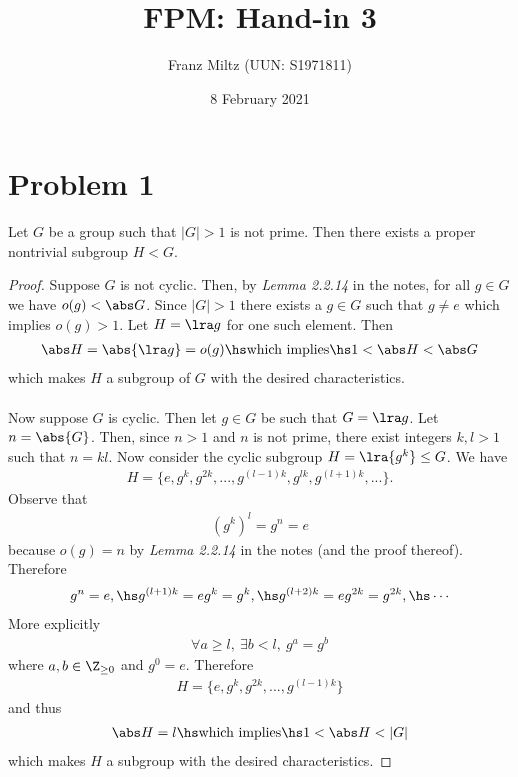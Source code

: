 \documentclass{article}
\begin{document}
\title{FPM: Hand-in 3}
\author{Franz Miltz (UUN: S1971811)}
\date{8 February 2021}
\maketitle

\section*{Problem 1}

\begin{claim*}
	Let $G$ be a group such that $|G|>1$ is not prime. Then
	there exists a proper nontrivial subgroup $H<G$.
\end{claim*}

\begin{proof}
	Suppose $G$ is not cyclic. Then, by \emph{Lemma 2.2.14} in the notes,
	for all $g\in G$ we have $o(g)<\abs G$. Since $|G|>1$ there exists
	a $g\in G$ such that $g\not=e$ which implies $o(g)>1$.
	Let $H=\lra g$ for one such element. Then
	\begin{align*}
		\abs H = \abs{\lra g} = o(g) \hs\text{which implies}\hs 1 < \abs H < \abs G
	\end{align*}
	which makes $H$ a subgroup of $G$ with
	the desired characteristics.\\\\
	Now suppose $G$ is cyclic. Then let $g\in G$ be such that
	$G=\lra g$. Let $n=\abs{G}$. Then, since $n>1$ and $n$ is not prime,
	there exist integers $k,l>1$ such that $n=kl$.
	Now consider the cyclic subgroup $H=\lra{g^k}\leq G$. We have
	\begin{align*}
		H =\{e, g^k, g^{2k}, ..., g^{(l-1)k}, g^{lk}, g^{(l+1)k}, ...\}.
	\end{align*}
	Observe that
	\begin{align*}
		\left(g^k\right)^l = g^n = e
	\end{align*}
	because $o(g)=n$ by \emph{Lemma 2.2.14} in the notes (and the proof
	thereof). Therefore
	\begin{align*}
		g^n = e,\hs g^{(l+1)k} = eg^k = g^k, \hs g^{(l+2)k}=eg^{2k}=g^{2k},\hs \cdots
	\end{align*}
	More explicitly
	\begin{align*}
		\forall a \geq l,\: \exists b<l,\: g^a = g^b
	\end{align*}
	where $a,b\in\Z_{\geq 0}$ and $g^0 = e$. Therefore
	\begin{align*}
		H = \{e, g^k, g^{2k}, ..., g^{(l-1)k}\}
	\end{align*}
	and thus
	\begin{align*}
		\abs H = l \hs\text{which implies}\hs 1 < \abs H < |G|
	\end{align*}
	which makes $H$ a subgroup with the desired characteristics.
\end{proof}
\end{document}
